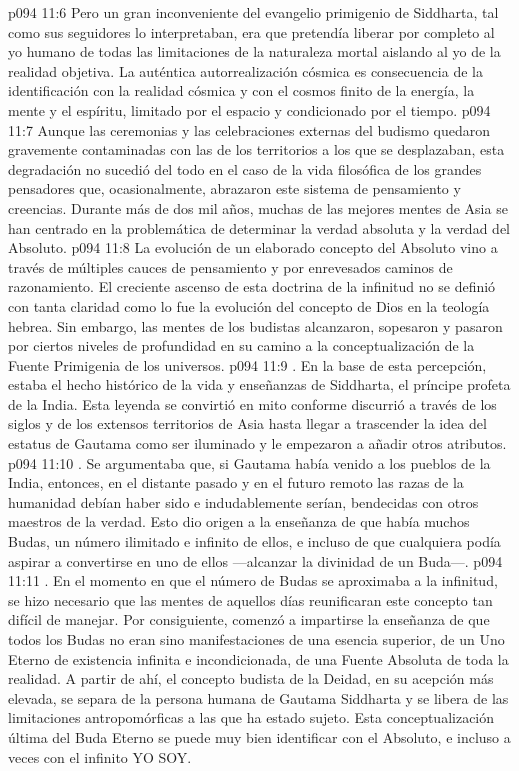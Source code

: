 \vs p094 11:6 Pero un gran inconveniente del evangelio primigenio de Siddharta, tal como sus seguidores lo interpretaban, era que pretendía liberar por completo al yo humano de todas las limitaciones de la naturaleza mortal aislando al yo de la realidad objetiva. La auténtica autorrealización cósmica es consecuencia de la identificación con la realidad cósmica y con el cosmos finito de la energía, la mente y el espíritu, limitado por el espacio y condicionado por el tiempo.
\vs p094 11:7 Aunque las ceremonias y las celebraciones externas del budismo quedaron gravemente contaminadas con las de los territorios a los que se desplazaban, esta degradación no sucedió del todo en el caso de la vida filosófica de los grandes pensadores que, ocasionalmente, abrazaron este sistema de pensamiento y creencias. Durante más de dos mil años, muchas de las mejores mentes de Asia se han centrado en la problemática de determinar la verdad absoluta y la verdad del Absoluto.
\vs p094 11:8 La evolución de un elaborado concepto del Absoluto vino a través de múltiples cauces de pensamiento y por enrevesados caminos de razonamiento. El creciente ascenso de esta doctrina de la infinitud no se definió con tanta claridad como lo fue la evolución del concepto de Dios en la teología hebrea. Sin embargo, las mentes de los budistas alcanzaron, sopesaron y pasaron por ciertos niveles de profundidad en su camino a la conceptualización de la Fuente Primigenia de los universos.
\vs p094 11:9 . En la base de esta percepción, estaba el hecho histórico de la vida y enseñanzas de Siddharta, el príncipe profeta de la India. Esta leyenda se convirtió en mito conforme discurrió a través de los siglos y de los extensos territorios de Asia hasta llegar a trascender la idea del estatus de Gautama como ser iluminado y le empezaron a añadir otros atributos.
\vs p094 11:10 . Se argumentaba que, si Gautama había venido a los pueblos de la India, entonces, en el distante pasado y en el futuro remoto las razas de la humanidad debían haber sido e indudablemente serían, bendecidas con otros maestros de la verdad. Esto dio origen a la enseñanza de que había muchos Budas, un número ilimitado e infinito de ellos, e incluso de que cualquiera podía aspirar a convertirse en uno de ellos ---alcanzar la divinidad de un Buda---.
\vs p094 11:11 . En el momento en que el número de Budas se aproximaba a la infinitud, se hizo necesario que las mentes de aquellos días reunificaran este concepto tan difícil de manejar. Por consiguiente, comenzó a impartirse la enseñanza de que todos los Budas no eran sino manifestaciones de una esencia superior, de un Uno Eterno de existencia infinita e incondicionada, de una Fuente Absoluta de toda la realidad. A partir de ahí, el concepto budista de la Deidad, en su acepción más elevada, se separa de la persona humana de Gautama Siddharta y se libera de las limitaciones antropomórficas a las que ha estado sujeto. Esta conceptualización última del Buda Eterno se puede muy bien identificar con el Absoluto, e incluso a veces con el infinito YO SOY.
